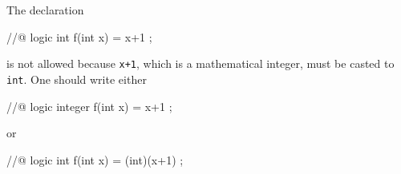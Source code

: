 \begin{example}
  The declaration
  \begin{c}
    //@ logic int f(int x) = x+1 ;
  \end{c}
  is not allowed because \verb!x+1!, which is a mathematical integer, must be
  casted to \texttt{int}.  One should write either
  \begin{c}
    //@ logic integer f(int x) = x+1 ;
  \end{c}
  or
  \begin{c}
    //@ logic int f(int x) = (int)(x+1) ;
  \end{c}
\end{example}